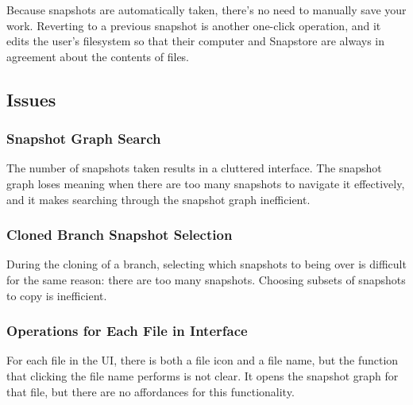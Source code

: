 Because snapshots are automatically taken, there's no need to manually save your work. Reverting to a previous snapshot is another one-click operation, and it edits the user's filesystem so that their computer and Snapstore are always in agreement about the contents of files.

\subsection{Issues}

\subsubsection{Snapshot Graph Search}

The number of snapshots taken results in a cluttered interface. The snapshot graph loses meaning when there are too many snapshots to navigate it effectively, and it makes searching through the snapshot graph inefficient.

\subsubsection{Cloned Branch Snapshot Selection}

During the cloning of a branch, selecting which snapshots to being over is difficult for the same reason: there are too many snapshots. Choosing subsets of snapshots to copy is inefficient.

\subsubsection{Operations for Each File in Interface}

For each file in the UI, there is both a file icon and a file name, but the function that clicking the file name performs is not clear. It opens the snapshot graph for that file, but there are no affordances for this functionality.

